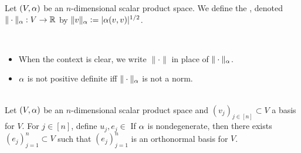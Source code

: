 \documentclass{book}
\begin{document}
	\begin{defn}
		Let $(V, \alpha)$ be an $n$-dimensional scalar product space. We define the , denoted $\| \cdot\|_{\alpha}: V \rightarrow \mathbb{R}$ by $\| v \|_{\alpha} \vcentcolon= |\alpha(v, v)|^{1/2}$.
	\end{defn}

	\begin{note}\
		\begin{itemize}
			\item When the context is clear, we write $\| \cdot \|$ in place of $\| \cdot \|_{\alpha}$.
			\item $\alpha$ is not positive definite iff $\|\cdot\|_{\alpha}$ is not a norm.
		\end{itemize}
	\end{note}


	\begin{ex}  \\
		Let $(V, \alpha)$ be an $n$-dimensional scalar product space and $(v_j)_{j \in [n]} \subset V$ a basis for $V$. For $j \in [n]$, define $u_j, e_j \in $ If $\alpha$ is nondegenerate, then there exists $(e_j)_{j=1}^n \subset V$ such that $(e_j)_{j=1}^n$ is an orthonormal basis for $V$.
	\end{ex}
\end{document}

